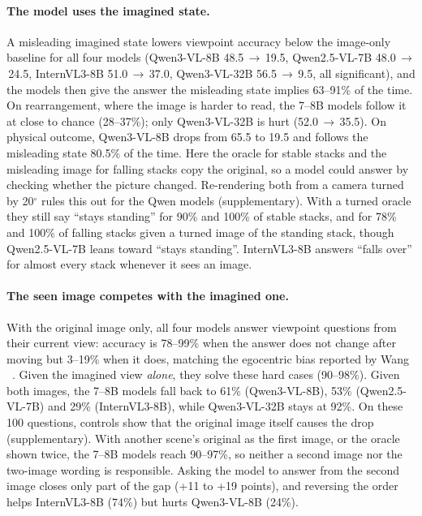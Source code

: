 \paragraph{The model uses the imagined state.} A misleading imagined state lowers viewpoint accuracy below the image-only baseline for all four models (Qwen3-VL-8B 48.5\,$\rightarrow$\,19.5, Qwen2.5-VL-7B 48.0\,$\rightarrow$\,24.5, InternVL3-8B 51.0\,$\rightarrow$\,37.0, Qwen3-VL-32B 56.5\,$\rightarrow$\,9.5, all significant), and the models then give the answer the misleading state implies 63--91\% of the time. On rearrangement, where the image is harder to read, the 7--8B models follow it at close to chance (28--37\%); only Qwen3-VL-32B is hurt (52.0\,$\rightarrow$\,35.5). On physical outcome, Qwen3-VL-8B drops from 65.5 to 19.5 and follows the misleading state 80.5\% of the time. Here the oracle for stable stacks and the misleading image for falling stacks copy the original, so a model could answer by checking whether the picture changed. Re-rendering both from a camera turned by 20$^\circ$ rules this out for the Qwen models (supplementary). With a turned oracle they still say ``stays standing'' for 90\% and 100\% of stable stacks, and for 78\% and 100\% of falling stacks given a turned image of the standing stack, though Qwen2.5-VL-7B leans toward ``stays standing''. InternVL3-8B answers ``falls over'' for almost every stack whenever it sees an image.

\paragraph{The seen image competes with the imagined one.} With the original image only, all four models answer viewpoint questions from their current view: accuracy is 78--99\% when the answer does not change after moving but 3--19\% when it does, matching the egocentric bias reported by Wang \etal~\cite{wang2026egocentric}. Given the imagined view \emph{alone}, they solve these hard cases (90--98\%). Given both images, the 7--8B models fall back to 61\% (Qwen3-VL-8B), 53\% (Qwen2.5-VL-7B) and 29\% (InternVL3-8B), while Qwen3-VL-32B stays at 92\%. On these 100 questions, controls show that the original image itself causes the drop (supplementary). With another scene's original as the first image, or the oracle shown twice, the 7--8B models reach 90--97\%, so neither a second image nor the two-image wording is responsible. Asking the model to answer from the second image closes only part of the gap (+11 to +19 points), and reversing the order helps InternVL3-8B (74\%) but hurts Qwen3-VL-8B (24\%).

